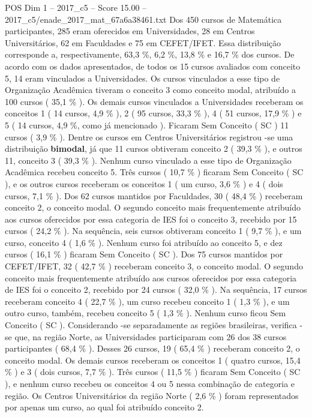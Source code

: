 \begin{textsample}{POS Dim 1 – 2017\_c5 – Score 15.00 – 2017\_c5/enade\_2017\_mat\_67a6a38461.txt}
Dos 450 cursos de Matemática participantes, 285 eram oferecidos em Universidades, 28 em Centros Universitários, 62 em Faculdades e 75 em CEFET/IFET.
Essa distribuição corresponde a, respectivamente, 63,3 \%, 6,2 \%, 13,8 \% e 16,7 \% dos cursos.
De acordo com os dados apresentados, de todos os 15 cursos avaliados com conceito 5, 14 eram vinculados a Universidades.
Os cursos vinculados a esse tipo de Organização Acadêmica tiveram o conceito 3 como conceito modal, atribuído a 100 cursos ( 35,1 \% ).
Os demais cursos vinculados a Universidades receberam os conceitos 1 ( 14 cursos, 4,9 \% ), 2 ( 95 cursos, 33,3 \% ), 4 ( 51 cursos, 17,9 \% ) e 5 ( 14 cursos, 4,9 \%, como já mencionado ).
Ficaram Sem Conceito ( SC ) 11 cursos ( 3,9 \% ).
Dentre os cursos em Centros Universitários registrou -se uma distribuição \textbf{bimodal}, já que 11 cursos obtiveram conceito 2 ( 39,3 \% ), e outros 11, conceito 3 ( 39,3 \% ).
Nenhum curso vinculado a esse tipo de Organização Acadêmica recebeu conceito 5.
Três cursos ( 10,7 \% ) ficaram Sem Conceito ( SC ), e os outros cursos receberam os conceitos 1 ( um curso, 3,6 \% ) e 4 ( dois cursos, 7,1 \% ).
Dos 62 cursos mantidos por Faculdades, 30 ( 48,4 \% ) receberam conceito 2, o conceito modal.
O segundo conceito mais frequentemente atribuído aos cursos oferecidos por essa categoria de IES foi o conceito 3, recebido por 15 cursos ( 24,2 \% ).
Na sequência, seis cursos obtiveram conceito 1 ( 9,7 \% ), e um curso, conceito 4 ( 1,6 \% ).
Nenhum curso foi atribuído ao conceito 5, e dez cursos ( 16,1 \% ) ficaram Sem Conceito ( SC ).
Dos 75 cursos mantidos por CEFET/IFET, 32 ( 42,7 \% ) receberam conceito 3, o conceito modal.
O segundo conceito mais frequentemente atribuído aos cursos oferecidos por essa categoria de IES foi o conceito 2, recebido por 24 cursos ( 32,0 \% ).
Na sequência, 17 cursos receberam conceito 4 ( 22,7 \% ), um curso recebeu conceito 1 ( 1,3 \% ), e um outro curso, também, recebeu conceito 5 ( 1,3 \% ).
Nenhum curso ficou Sem Conceito ( SC ).
Considerando -se separadamente as regiões brasileiras, verifica -se que, na região Norte, as Universidades participaram com 26 dos 38 cursos participantes ( 68,4 \% ).
Desses 26 cursos, 19 ( 65,4 \% ) receberam conceito 2, o conceito modal.
Os demais cursos receberam os conceitos 1 ( quatro cursos, 15,4 \% ) e 3 ( dois cursos, 7,7 \% ).
Três cursos ( 11,5 \% ) ficaram Sem Conceito ( SC ), e nenhum curso recebeu os conceitos 4 ou 5 nessa combinação de categoria e região.
Os Centros Universitários da região Norte ( 2,6 \% ) foram representados por apenas um curso, ao qual foi atribuído conceito 2.

\end{textsample}

